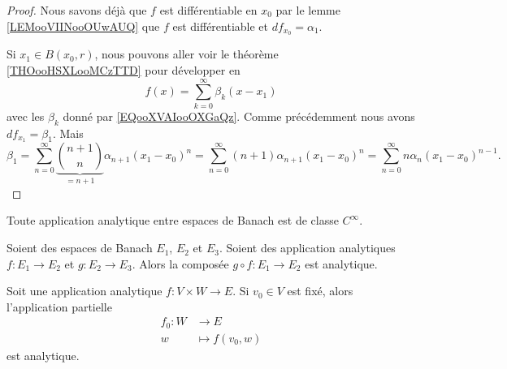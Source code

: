 \begin{proof}
	Nous savons déjà que \( f\) est différentiable en \( x_0\) par le lemme \ref{LEMooVIINooOUwAUQ} que \( f\) est différentiable et \( df_{x_0}=\alpha_1\).

	Si \( x_1\in B(x_0,r)\), nous pouvons aller voir le théorème \ref{THOooHSXLooMCzTTD} pour développer en
	\begin{equation}
		f(x)=\sum_{k=0}^{\infty}\beta_k(x-x_1)
	\end{equation}
	avec les \( \beta_k\) donné par \eqref{EQooXVAIooOXGaQz}. Comme précédemment nous avons \( df_{x_1}=\beta_1\). Mais
	\begin{equation}
		\beta_1=\sum_{n=0}^{\infty}\underbrace{\binom{ n+1 }{ n }}_{=n+1}\alpha_{n+1}(x_1-x_0)^n=\sum_{n=0}^{\infty}(n+1)\alpha_{n+1}(x_1-x_0)^n=\sum_{n=0}^{\infty}n\alpha_n(x_1-x_0)^{n-1}.
	\end{equation}
\end{proof}


\begin{proposition}	\label{PROPooGMWRooPIzwus}
	Toute application analytique entre espaces de Banach est de classe \( C^{\infty}\).
\end{proposition}


\begin{proposition}	\label{PROPooXKHBooQvvNmN}
	Soient des espaces de Banach \( E_1\), \( E_2\) et \( E_3\). Soient des application analytiques \(f \colon E_1\to E_2  \) et \(g \colon E_2\to E_3  \). Alors la composée \(g\circ f \colon E_1 \to E_2  \) est analytique.
\end{proposition}

\begin{proposition}	\label{PROPooKHAYooCxMgep}
	Soit une application analytique \(f \colon V\times W\to  E \). Si \( v_0\in V\) est fixé, alors l'application partielle
	\begin{equation}
		\begin{aligned}
			f_0\colon W & \to E            \\
			w           & \mapsto f(v_0,w)
		\end{aligned}
	\end{equation}
	est analytique.
\end{proposition}

